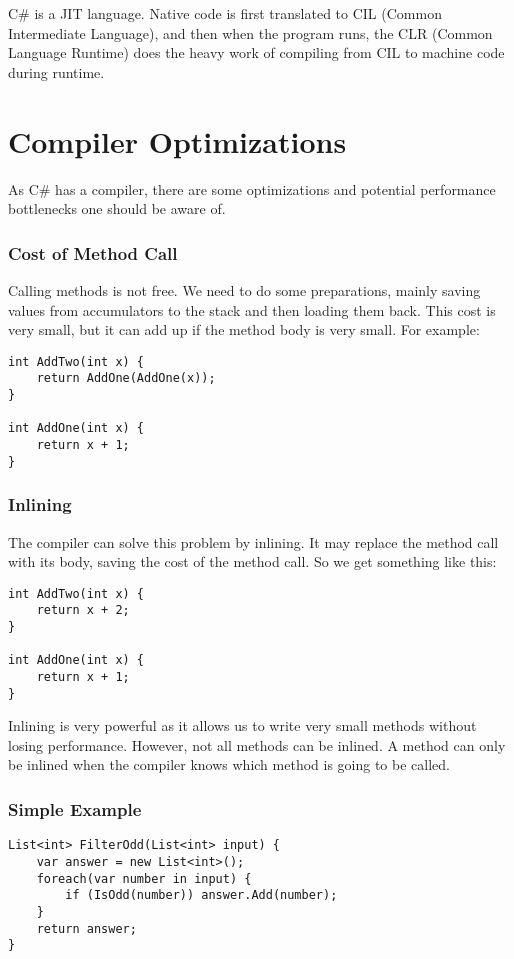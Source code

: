 C\# is a JIT language. Native code is first translated to CIL (Common Intermediate Language), and then when the program runs, the CLR (Common Language Runtime) does the heavy work of compiling from CIL to machine code during runtime.

\section{Compiler Optimizations}

As C\# has a compiler, there are some optimizations and potential performance bottlenecks one should be aware of.

\subsubsection{Cost of Method Call}
Calling methods is not free. We need to do some preparations, mainly saving values from accumulators to the stack and then loading them back. This cost is very small, but it can add up if the method body is very small. For example:

\begin{lstlisting}
int AddTwo(int x) {
    return AddOne(AddOne(x));
}

int AddOne(int x) {
    return x + 1;
}
\end{lstlisting}

\subsubsection{Inlining}
The compiler can solve this problem by inlining. It may replace the method call with its body, saving the cost of the method call. So we get something like this:

\begin{lstlisting}
int AddTwo(int x) {
    return x + 2;
}

int AddOne(int x) {
    return x + 1;
}
\end{lstlisting}

Inlining is very powerful as it allows us to write very small methods without losing performance. However, not all methods can be inlined. A method can only be inlined when the compiler knows which method is going to be called.

\subsubsection{Simple Example}
\begin{lstlisting}
List<int> FilterOdd(List<int> input) {
    var answer = new List<int>();
    foreach(var number in input) {
        if (IsOdd(number)) answer.Add(number);
    }
    return answer;
}
\end{lstlisting}

